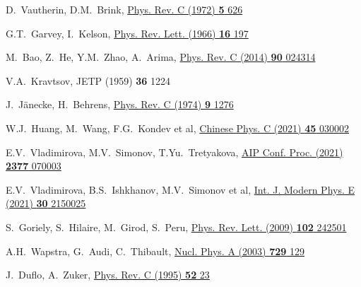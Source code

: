 \begin{thebibliography}{9}
D.~Vautherin, D.M.~Brink,
\href{https://doi.org/10.1103/PhysRevC.5.626}
  {Phys. Rev. C (1972) \textbf{5} 626}

G.T.~Garvey, I.~Kelson,
\href{https://doi.org/10.1103/PhysRevLett.16.197}
  {Phys. Rev. Lett. (1966) \textbf{16} 197}

M.~Bao, Z.~He, Y.M.~Zhao, A.~Arima,
\href{https://doi.org/10.1103/PhysRevC.90.024314}
  {Phys. Rev. C (2014) \textbf{90} 024314}

V.A.~Kravtsov,
JETP (1959) \textbf{36} 1224

J.~J{\"a}necke, H.~Behrens,
\href{https://doi.org/10.1103/PhysRevC.9.1276}
  {Phys. Rev. C (1974) \textbf{9} 1276}

W.J.~Huang, M.~Wang, F.G.~Kondev et al,
\href{https://doi.org/10.1088/1674-1137/abddb0}
  {Chinese Phys. C (2021) \textbf{45} 030002}

E.V.~Vladimirova, M.V.~Simonov, T.Yu.~Tretyakova,
\href{https://doi.org/10.1063/5.0063340}
  {AIP Conf. Proc. (2021) \textbf{2377} 070003}

E.V.~Vladimirova, B.S.~Ishkhanov, M.V.~Simonov et al,
\href{https://doi.org/10.1142/S0218301321500257}
  {Int. J. Modern Phys. E (2021) \textbf{30} 2150025}

S.~Goriely, S.~Hilaire, M.~Girod, S.~Peru,
\href{https://doi.org/10.1103/PhysRevLett.102.242501}
  {Phys. Rev. Lett. (2009) \textbf{102} 242501}

A.H.~Wapstra, G.~Audi, C.~Thibault,
\href{https://doi.org/10.1016/j.nuclphysa.2003.11.002}
  {Nucl. Phys. A (2003) \textbf{729} 129}

J.~Duflo, A.~Zuker,
\href{https://doi.org/10.1103/PhysRevC.52.R23}
  {Phys. Rev. C (1995) \textbf{52} 23}


\end{thebibliography}
